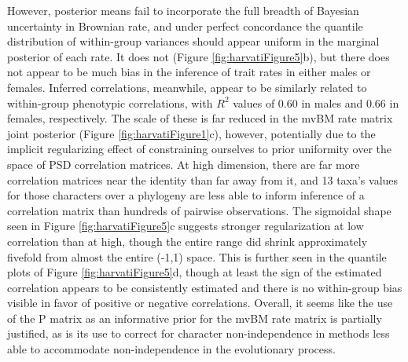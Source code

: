 \documentclass[10pt, twocolumn, twoside]{article}
\begin{document}
However, posterior means fail to incorporate the full breadth of Bayesian uncertainty in Brownian rate, and under perfect concordance the quantile distribution of within-group variances should appear uniform in the marginal posterior of each rate. It does not (Figure \ref{fig:harvatiFigure5}b), but there does not appear to be much bias in the inference of trait rates in either males or females. Inferred correlations, meanwhile, appear to be similarly related to within-group phenotypic correlations, with $R^2$ values of 0.60 in males and 0.66 in females, respectively. The scale of these is far reduced in the mvBM rate matrix joint posterior (Figure \ref{fig:harvatiFigure1}c), however, potentially due to the implicit regularizing effect of constraining ourselves to prior uniformity over the space of PSD correlation matrices. At high dimension, there are far more correlation matrices near the identity than far away from it, and 13 taxa's values for those characters over a phylogeny are less able to inform inference of a correlation matrix than hundreds of pairwise observations. The sigmoidal shape seen in Figure \ref{fig:harvatiFigure5}c suggests stronger regularization at low correlation than at high, though the entire range did shrink approximately fivefold from almost the entire (-1,1) space. This is further seen in the quantile plots of Figure \ref{fig:harvatiFigure5}d, though at least the sign of the estimated correlation appears to be consistently estimated and there is no within-group bias visible in favor of positive or negative correlations. Overall, it seems like the use of the P matrix as an informative prior for the mvBM rate matrix is partially justified, as is its use to correct for character non-independence in methods less able to accommodate non-independence in the evolutionary process.
\end{document}
